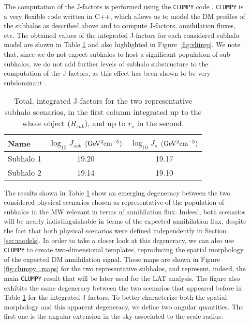 \documentclass[%
 reprint,
nofootinbib,
 amsmath,amssymb,
 aps,
]{revtex4-2}
\begin{document}


The computation of the J-factors is performed using the \texttt{CLUMPY} code \cite{Charbonnier:2012gf, Bonnivard:2015pia, Hutten:2018aix}. \texttt{CLUMPY} is a very flexible code written in C++, which allows us to model the DM profiles of the subhalos as described above and to compute J-factors, annihilation fluxes, etc. The obtained values of the integrated J-factors for each considered subhalo model are shown in Table \ref{tab:j-factors} and also highlighted in Figure~\ref{fig:vliirep}. We note that, since we do not expect subhalos to host a significant population of sub-subhalos, we do not add further levels of subhalo substructure to the computation of the J-factors, as this effect has been shown to be very subdominant \cite{Moline+17}. 

\begin{table}[ht!]
\caption{Total, integrated J-factors for the two representative subhalo scenarios, in the first column integrated up to the whole object ($R_{sub}$), and up to $r_s$ in the second. }
\centering
\begin{tabular}{  l  c  c  }
\hline
\hline
Name & $\log_{10}J_{sub}$ $\rm (GeV^2 cm^{-5})$ & $\log_{10}J_{s}$ $\rm (GeV^2 cm^{-5})$ \\
\hline
Subhalo 1 & 19.20 & 19.17 \\
Subhalo 2 & 19.14 & 19.10 \\ 
\hline
\hline
\end{tabular}
\label{tab:j-factors}
\end{table}

The results shown in Table \ref{tab:j-factors} show an emerging degeneracy between the two considered physical scenarios chosen as representative of the population of subhalos in the MW relevant in terms of annihilation flux. Indeed, both scenarios will be nearly indistinguishable in terms of the expected annihilation flux, despite the fact that both physical scenarios were defined independently in Section \ref{sec:models}. In order to take a closer look at this degeneracy, we can also use \texttt{CLUMPY} to create two-dimensional templates, reproducing the spatial morphology of the expected DM annihilation signal. These maps are shown in Figure \ref{fig:clumpy_maps} for the two representative subhalos, and represent, indeed, the main \texttt{CLUMPY} result that will be later used for the LAT analysis. The figure also exhibits the same degeneracy between the two scenarios that appeared before in Table \ref{tab:j-factors} for the integrated J-factors. To better characterize both the spatial morphology and this apparent degeneracy, we define two angular quantities. The first one is the angular extension in the sky associated to the scale radius:
\end{document}
